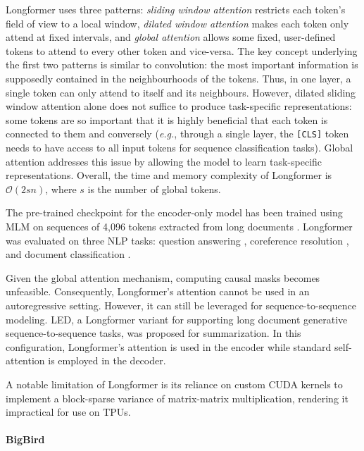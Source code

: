Longformer \citep{beltagy2020longformer} uses three patterns: \textit{sliding window attention} restricts each token's field of view to a local window, \textit{dilated window attention} makes each token only attend at fixed intervals, and \textit{global attention} allows some fixed, user-defined tokens to attend to every other token and vice-versa. The key concept underlying the first two patterns is similar to convolution: the most important information is supposedly contained in the neighbourhoods of the tokens. Thus, in one layer, a single token can only attend to itself and its neighbours. However, dilated sliding window attention alone does not suffice to produce task-specific representations: some tokens are so important that it is highly beneficial that each token is connected to them and conversely (\textit{e.g.}, through a single layer, the \texttt{[CLS]} token needs to have access to all input tokens for sequence classification tasks). Global attention addresses this issue by allowing the model to learn task-specific representations. Overall, the time and memory complexity of Longformer is $\mathcal{O}(2sn)$, where $s$ is the number of global tokens. 

The pre-trained checkpoint for the encoder-only model has been trained using \ac{MLM} on sequences of 4,096 tokens extracted from long documents \citep{trinh2018simple, zellers2019defending}. Longformer was evaluated on three \ac{NLP} tasks: question answering \citep{welbl2018constructing, joshi2017triviaqa, yang2018hotpotqa}, coreference resolution \citep{pradhan2012conll}, and document classification \citep{maas2011learning, kiesel2019semeval}. 

Given the global attention mechanism, computing causal masks becomes unfeasible. Consequently, Longformer's attention cannot be used in an autoregressive setting. However, it can still be leveraged for sequence-to-sequence modeling. \ac{LED}, a Longformer variant for supporting long document generative sequence-to-sequence tasks, was proposed for summarization. In this configuration, Longformer's attention is used in the encoder while standard self-attention is employed in the decoder. 

A notable limitation of Longformer is its reliance on custom CUDA kernels to implement a block-sparse variance of matrix-matrix multiplication, rendering it impractical for use on TPUs.

\paragraph{BigBird}

